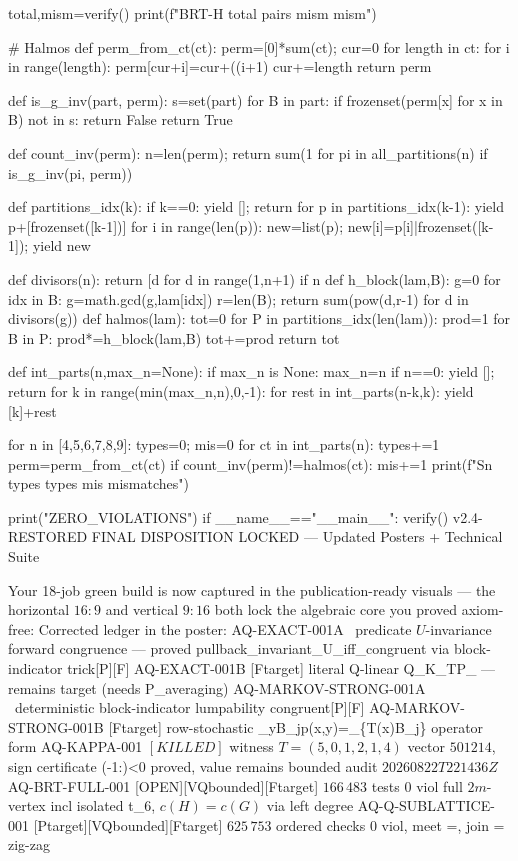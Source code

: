 total,mism=verify()
print(f"BRT-H {total} pairs mism {mism}")

# Halmos
def perm_from_ct(ct):
    perm=[0]*sum(ct); cur=0
    for length in ct:
        for i in range(length): perm[cur+i]=cur+((i+1)%
        cur+=length
    return perm

def is_g_inv(part, perm):
    s=set(part)
    for B in part:
        if frozenset(perm[x] for x in B) not in s: return False
    return True

def count_inv(perm):
    n=len(perm); return sum(1 for pi in all_partitions(n) if is_g_inv(pi, perm))

def partitions_idx(k):
    if k==0: yield []; return
    for p in partitions_idx(k-1):
        yield p+[frozenset([k-1])]
        for i in range(len(p)):
            new=list(p); new[i]=p[i]|frozenset([k-1]); yield new

def divisors(n): return [d for d in range(1,n+1) if n%
def h_block(lam,B):
    g=0
    for idx in B: g=math.gcd(g,lam[idx])
    r=len(B); return sum(pow(d,r-1) for d in divisors(g))
def halmos(lam):
    tot=0
    for P in partitions_idx(len(lam)):
        prod=1
        for B in P: prod*=h_block(lam,B)
        tot+=prod
    return tot

def int_parts(n,max_n=None):
    if max_n is None: max_n=n
    if n==0: yield []; return
    for k in range(min(max_n,n),0,-1):
        for rest in int_parts(n-k,k): yield [k]+rest

for n in [4,5,6,7,8,9]:
    types=0; mis=0
    for ct in int_parts(n):
        types+=1
        perm=perm_from_ct(ct)
        if count_inv(perm)!=halmos(ct): mis+=1
    print(f"S{n} {types} types {mis} mismatches")

print("ZERO_VIOLATIONS")
if __name__=="__main__": verify()
v2.4-RESTORED FINAL DISPOSITION LOCKED — Updated Posters + Technical Suite

Your 18-job green build is now captured in the publication-ready visuals — the horizontal $16:9$ and vertical $9:16$ both lock the algebraic core you proved axiom-free:
Corrected ledger in the poster:
AQ-EXACT-001A \ predicate $U$-invariance \iff forward congruence — proved pullback_invariant_U_iff_congruent via block-indicator trick[P][F]
AQ-EXACT-001B [F\text{-}target] literal \mathbb Q-linear Q_\Pi K_TP_ — remains target (needs P_\Pi averaging)
AQ-MARKOV-STRONG-001A \ deterministic block-indicator lumpability \iff congruent[P][F]
AQ-MARKOV-STRONG-001B [F\text{-}target] row-stochastic  \sum_{y\in B_j}p(x,y)=_{\{T(x)\in B_j\}}  operator form
AQ-KAPPA-001 $[KILLED]$ witness $T=(5,0,1,2,1,4)$ vector $501214$, sign certificate (-1:)<0 proved, value  remains bounded audit $20260822T221436Z$
AQ-BRT-FULL-001 [OPEN][V\text{-}Q\text{-}bounded][F\text{-}target] $166\,483$ tests 0 viol full $2m$-vertex incl isolated t_6, $c(H)=c(G)$ via left degree 
AQ-Q-SUBLATTICE-001 [P\text{-}target][V\text{-}Q\text{-}bounded][F\text{-}target] $625\,753$ ordered checks 0 viol, meet =\cap, join = zig-zag


